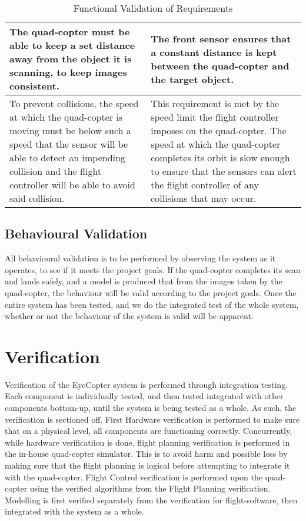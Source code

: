 \documentclass[10pt,letterpaper]{article}
\begin{document}
\begin{table}[H]
{\begin{tabular}{p{6cm}p{8cm}}
          \\ \hline
          The quad-copter must be able to keep a set distance away from the object it is scanning, to keep images consistent. & The front sensor ensures that a constant distance is kept between the quad-copter and the target object.
          \\ \hline
          To prevent collisions, the speed at which the quad-copter is moving must be below such a speed that the sensor will be able to detect an impending collision and the flight controller will be able to avoid said collision. & This requirement is met by the speed limit the flight controller imposes on the quad-copter. The speed at which the quad-copter completes its orbit is slow enough to ensure that the sensors can alert the flight controller of any collisions that may occur.
          \\ \hline
          
      \end{tabular}}
  \caption{Functional Validation of Requirements}
\end{table}
\subsection{Behavioural Validation}
All behavioural validation is to be performed by observing the system as it operates, to see if it meets the project goals. If the quad-copter completes its scan and lands safely, and a model is produced that from the images taken by the quad-copter, the behaviour will be valid according to the project goals. Once the entire system has been tested, and we do the integrated test of the whole system, whether or not the behaviour of the system is valid will be apparent.


\newpage


\section{Verification}
Verification of the EyeCopter system is performed through integration testing. Each component is individually tested, and then tested integrated with other components bottom-up, until the system is being tested as a whole. As such, the verification is sectioned off. First Hardware verification is performed to make sure that on a physical level, all components are functioning correctly. Concurrently, while hardware verificatiion is done, flight planning verification is performed in the in-house quad-copter simulator. This is to avoid harm and possible loss by making sure that the flight planning is logical before attempting to integrate it with the quad-copter. Flight Control verification is performed upon the quad-copter using the verified algorithms from the Flight Planning verification. Modelling is first verified separately from the verification for flight-software, then integrated with the system as a whole.
\end{document}
